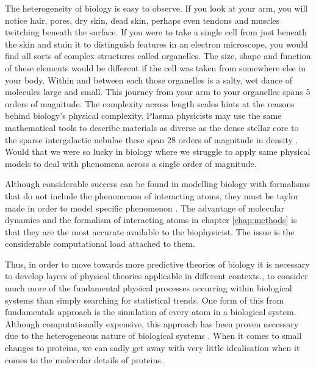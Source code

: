 The heterogeneity of biology is easy to observe. If you look at your arm, you will notice hair, pores, dry skin, dead skin, perhaps even tendons and muscles twitching beneath the surface. If you were to take a single cell from just beneath the skin and stain it to distinguish features in an electron microscope, you would find all sorts of complex structures called organelles. The size, shape and function of these elements would be different if the cell was taken from somewhere else in your body. Within and between each those organelles is a salty, wet dance of molecules large and small. This journey from your arm to your organelles spans 5 orders of magnitude. The complexity across length scales hints at the reasons behind biology's physical complexity. Plasma physicists may use the same mathematical tools to describe materials as diverse as the dense stellar core to the sparse intergalactic nebulae these span 28 orders of magnitude in density \cite{chen2018}. Would that we were so lucky in biology where we struggle to apply same physical models to deal with phenomena across a single order of magnitude.  

Although considerable success can be found in modelling biology with formalisms that do not include the phenomenon of interacting atoms, they must be taylor made in order to model specific phenomenon \cite{phillips2012}. The advantage of molecular dynamics and the formalism of interacting atoms in chapter \ref{chap:methods} is that they are the most accurate available to the biophysicist. The issue is the considerable computational load attached to them. 

Thus, in order to move towards more predictive theories of biology it is necessary to develop layers of physical theories applicable in different contexts., to consider much more of the fundamental physical processes occurring within biological systems than simply searching for statistical trends. One form of this from fundamentals approach is the simulation of every atom in a biological system. Although computationally expensive, this approach has been proven necessary due to the heterogeneous nature of biological systems \cite{moy2000, corry2000a}. When it comes to small changes to proteins, we can sadly get away with very little idealisation when it comes to the molecular details of proteins.



